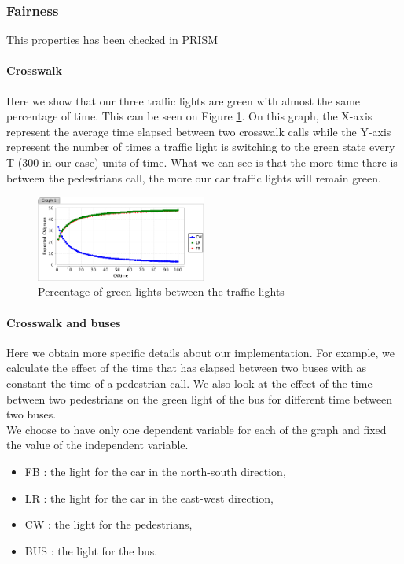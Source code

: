 \subsubsection{Fairness} \label{verif:fairness}

This properties has been checked in PRISM

\paragraph{Crosswalk}

Here we show that our three traffic lights are green with almost the same percentage of time. This can be seen on Figure \ref{fig:prism1}. On this graph, the X-axis represent the average time elapsed between two crosswalk calls while the Y-axis represent the number of times a traffic light is switching to the green state every T (300 in our case) units of time. What we can see is that the more time there is between the pedestrians call, the more our car traffic lights will remain green.

\begin{figure}[H]\label{fig:prism1}
  \centering
    \includegraphics[width=0.5\textwidth]{picture/graphprism.png}
    \caption{Percentage of green lights between the traffic lights}
\end{figure}

\paragraph{Crosswalk and buses}

Here we obtain more specific details about our implementation. For example, we calculate the effect of the time that has elapsed between two buses with as constant the time of a pedestrian call. We also look at the effect of the time between two pedestrians on the green light of the bus for different time between two buses. \\

We choose to have only one dependent variable for each of the graph and fixed the value of the independent variable.
\begin{itemize}
	\item FB : the light for the car in the north-south direction,
	\item LR : the light for the car in the east-west direction,
	\item CW : the light for the pedestrians,
	\item BUS : the light for the bus.
\end{itemize}


